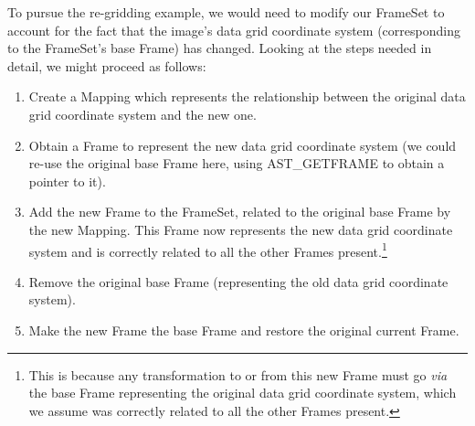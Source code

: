 \documentclass[twoside,11pt]{article}
\newcommand{\htmlref}[2]{#1}
\begin{document}
To pursue the re-gridding example, we would need to modify our
FrameSet to account for the fact that the image's data grid coordinate
system (corresponding to the FrameSet's base Frame) has
changed. Looking at the steps needed in detail, we might proceed as
follows:

\begin{enumerate}
\item Create a \htmlref{Mapping}{Mapping} which represents the relationship between the
original data grid coordinate system and the new one.

\item Obtain a Frame to represent the new data grid coordinate system
(we could re-use the original base Frame here, using \htmlref{AST\_GETFRAME}{AST_GETFRAME} to
obtain a pointer to it).

\item Add the new Frame to the FrameSet, related to the original base
Frame by the new Mapping. This Frame now represents the new data grid
coordinate system and is correctly related to all the other Frames
present.\footnote{This is because any transformation to or from this
new Frame must go {\em{via}} the base Frame representing the original
data grid coordinate system, which we assume was correctly related to
all the other Frames present.}

\item Remove the original base Frame (representing the old data grid
coordinate system).

\item Make the new Frame the base Frame and restore the original
current Frame.
\end{enumerate}
\end{document}
